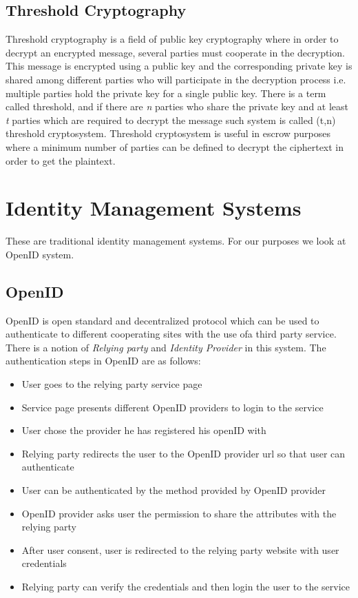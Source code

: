 \subsection{Threshold Cryptography}
Threshold cryptography is a field of public key cryptography where in order to decrypt an encrypted message, several parties must cooperate in the decryption. This message is encrypted using a public key and the corresponding private key is shared among different parties who will participate in the decryption process i.e. multiple parties hold the private key for a single public key. There is a term called threshold, and if there are \textit{n} parties who share the private key and at least \textit{t} parties which are required to decrypt the message such system is called (t,n) threshold cryptosystem. Threshold cryptosystem is useful in escrow purposes where a minimum number of parties can be defined to decrypt the ciphertext in order to get the plaintext.

\section{Identity Management Systems}
These are traditional identity management systems. For our purposes we look at OpenID system.
\subsection{OpenID}
OpenID is open standard and decentralized protocol which can be used to authenticate to different cooperating sites with the use ofa third party service. There is a notion of \textit{Relying party} and \textit{Identity Provider} in this system. The authentication steps in OpenID are as follows:
\begin{itemize}
\item User goes to the relying party service page
\item Service page presents different OpenID providers to login to the service
\item User chose the provider he has registered his openID with
\item Relying party redirects the user to the OpenID provider url so that user can authenticate
\item User can be authenticated by the method provided by OpenID provider
\item OpenID provider asks user the permission to share the attributes with the relying party
\item After user consent, user is redirected to the relying party website with user credentials
\item Relying party can verify the credentials and then login the user to the service
\end{itemize}